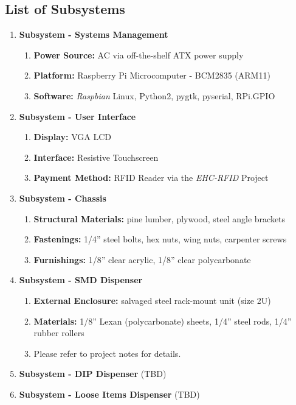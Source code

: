 \documentclass[12pt,oneside,final]{article}
\begin{document}
\subsection{List of Subsystems}
\begin{enumerate}
  \item \textbf{Subsystem - Systems Management}
    \begin{enumerate}
      \item \textbf{Power Source:} AC via off-the-shelf ATX power supply
      \item \textbf{Platform:} Raspberry Pi Microcomputer - BCM2835 (ARM11)
      \item \textbf{Software:} \emph{Raspbian} Linux, Python2, pygtk, pyserial, RPi.GPIO
    \end{enumerate}
  \item \textbf{Subsystem - User Interface}
    \begin{enumerate}
      \item \textbf{Display:} VGA LCD
      \item \textbf{Interface:} Resistive Touchscreen
      \item \textbf{Payment Method:} RFID Reader via the \emph{EHC-RFID} Project
    \end{enumerate}
  \item \textbf{Subsystem - Chassis}
    \begin{enumerate}
      \item \textbf{Structural Materials:} pine lumber, plywood, steel angle brackets
      \item \textbf{Fastenings:} 1/4'' steel bolts, hex nuts, wing nuts, carpenter screws
      \item \textbf{Furnishings:} 1/8'' clear acrylic, 1/8'' clear polycarbonate
    \end{enumerate}
  \item \textbf{Subsystem - SMD Dispenser}
    \begin{enumerate}
      \item \textbf{External Enclosure:} salvaged steel rack-mount unit (size 2U)
      \item \textbf{Materials:} 1/8'' Lexan (polycarbonate) sheets, 1/4'' steel rods, 1/4'' rubber rollers
      \item Please refer to project notes for details.
    \end{enumerate}
  \item \textbf{Subsystem - DIP Dispenser} (TBD)
  \item \textbf{Subsystem - Loose Items Dispenser} (TBD)
\end{enumerate}
\end{document}
